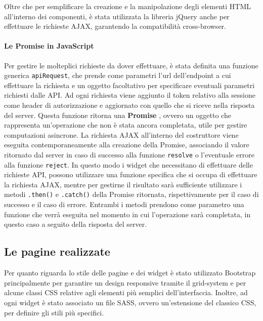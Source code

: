 Oltre che per semplificare la creazione e la manipolazione degli elementi HTML
all'interno dei componenti, è stata utilizzata la libreria jQuery \cite{jquery}
anche per effettuare le richieste AJAX, garantendo la compatibilità cross-browser.

\paragraph{Le Promise in JavaScript}
Per gestire le molteplici richieste da dover effettuare, è stata definita una
funzione generica \texttt{apiRequest}, che prende come parametri l'url dell'endpoint
a cui effettuare la richiesta e un oggetto facoltativo per specificare eventuali
parametri richiesti dalle API. Ad ogni richiesta viene aggiunto il token relativo
alla sessione come header di autorizzazione e aggiornato con quello che si riceve
nella risposta del server.
Questa funzione ritorna una \textbf{Promise} \cite{mdn:promise}, ovvero un oggetto
che rappresenta un'operazione che non è stata ancora completata, utile per gestire
computazioni asincrone. La richiesta AJAX all'interno del costruttore viene eseguita
contemporaneamente alla creazione della Promise, associando il valore ritornato
dal server in caso di successo alla funzione \texttt{resolve} o l'eventuale
errore alla funzione \texttt{reject}.
In questo modo i widget che necessitano di effettuare delle richieste API,
possono utilizzare una funzione specifica che si occupa di effettuare la richiesta
AJAX, mentre per gestirne il risultato sarà sufficiente utilizzare i metodi
\texttt{.then()} e \texttt{.catch()} della Promise ritornata, rispettivamente per
il caso di successo e il caso di errore. Entrambi i metodi
prendono come parametro una funzione che verrà eseguita nel momento in cui
l'operazione sarà completata, in questo caso a seguito della risposta del server.




\subsection{Le pagine realizzate}
Per quanto riguarda lo stile delle pagine e dei widget è stato utilizzato Bootstrap
principalmente per garantire un design responsive tramite il grid-system \cite{bootstrap:grid}
e per alcune classi CSS relative agli elementi più semplici dell'interfaccia.
Inoltre, ad ogni widget è stato associato un file SASS, ovvero un'estensione del
classico CSS, per definire gli stili più specifici.

